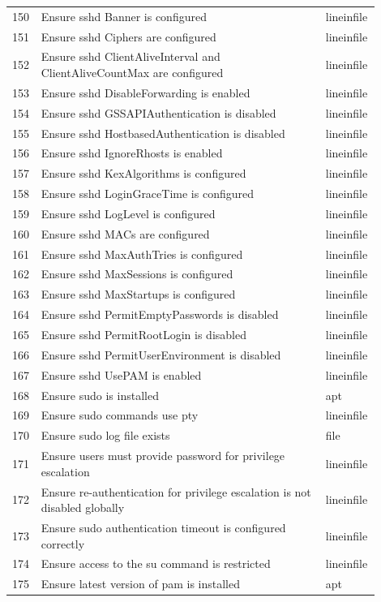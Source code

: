 \begin{longtable}{|p{0.05\linewidth}|p{0.75\linewidth}|p{0.1\linewidth}|}
150 & Ensure sshd Banner is configured & lineinfile \\
151 & Ensure sshd Ciphers are configured & lineinfile \\
152 & Ensure sshd ClientAliveInterval and ClientAliveCountMax are configured & lineinfile \\
153 & Ensure sshd DisableForwarding is enabled & lineinfile \\
154 & Ensure sshd GSSAPIAuthentication is disabled & lineinfile \\
155 & Ensure sshd HostbasedAuthentication is disabled & lineinfile \\
156 & Ensure sshd IgnoreRhosts is enabled & lineinfile \\
157 & Ensure sshd KexAlgorithms is configured & lineinfile \\
158 & Ensure sshd LoginGraceTime is configured & lineinfile \\
159 & Ensure sshd LogLevel is configured & lineinfile \\
160 & Ensure sshd MACs are configured & lineinfile \\
161 & Ensure sshd MaxAuthTries is configured & lineinfile \\
162 & Ensure sshd MaxSessions is configured & lineinfile \\
163 & Ensure sshd MaxStartups is configured & lineinfile \\
164 & Ensure sshd PermitEmptyPasswords is disabled & lineinfile \\
165 & Ensure sshd PermitRootLogin is disabled & lineinfile \\
166 & Ensure sshd PermitUserEnvironment is disabled & lineinfile \\
167 & Ensure sshd UsePAM is enabled & lineinfile \\
168 & Ensure sudo is installed & apt \\
169 & Ensure sudo commands use pty & lineinfile \\
170 & Ensure sudo log file exists & file \\
171 & Ensure users must provide password for privilege escalation & lineinfile \\
172 & Ensure re-authentication for privilege escalation is not disabled globally & lineinfile \\
173 & Ensure sudo authentication timeout is configured correctly & lineinfile \\
174 & Ensure access to the su command is restricted & lineinfile \\
175 & Ensure latest version of pam is installed & apt \\

\end{longtable}
